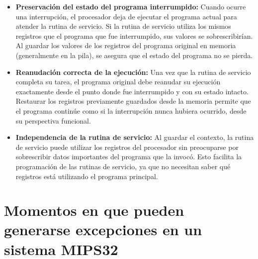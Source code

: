 \documentclass{article}
\begin{document}
\begin{itemize}[leftmargin=*, noitemsep, topsep=0pt]
    \item \textbf{Preservación del estado del programa interrumpido:} 
    Cuando ocurre una interrupción, el procesador deja de ejecutar el programa actual para atender la rutina de servicio. Si la rutina de servicio utiliza los mismos registros que el programa que fue interrumpido, sus valores se sobrescribirían. Al guardar los valores de los registros del programa original en memoria (generalmente en la pila), se asegura que el estado del programa no se pierda.
    
    \item \textbf{Reanudación correcta de la ejecución:} 
    Una vez que la rutina de servicio completa su tarea, el programa original debe reanudar su ejecución exactamente desde el punto donde fue interrumpido y con su estado intacto. Restaurar los registros previamente guardados desde la memoria permite que el programa continúe como si la interrupción nunca hubiera ocurrido, desde su perspectiva funcional.
    
    \item \textbf{Independencia de la rutina de servicio:} 
    Al guardar el contexto, la rutina de servicio puede utilizar los registros del procesador sin preocuparse por sobrescribir datos importantes del programa que la invocó. Esto facilita la programación de las rutinas de servicio, ya que no necesitan saber qué registros está utilizando el programa principal.
\end{itemize}

\section{Momentos en que pueden generarse excepciones en un sistema MIPS32}
\end{document}
